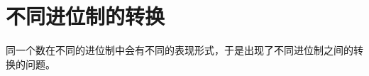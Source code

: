 \section{不同进位制的转换}\label{sec:ArithBasics/positional-notation-conversion}
    同一个数在不同的进位制中会有不同的表现形式，于是出现了不同进位制之间的转换的问题。
